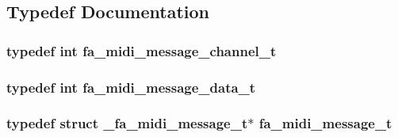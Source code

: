 \subsection{Typedef Documentation}
\hypertarget{group___fa_midi_message_gae7fc48e105b9bec5500bc422231a1159}{
\subsubsection[{fa\-\_\-midi\-\_\-message\-\_\-channel\-\_\-t}]{\setlength{\rightskip}{0pt plus 5cm}typedef int {\bf fa\-\_\-midi\-\_\-message\-\_\-channel\-\_\-t}}}\label{group___fa_midi_message_gae7fc48e105b9bec5500bc422231a1159}
\hypertarget{group___fa_midi_message_gadc3c487a2892db5309395922f92e8d28}{
\subsubsection[{fa\-\_\-midi\-\_\-message\-\_\-data\-\_\-t}]{\setlength{\rightskip}{0pt plus 5cm}typedef int {\bf fa\-\_\-midi\-\_\-message\-\_\-data\-\_\-t}}}\label{group___fa_midi_message_gadc3c487a2892db5309395922f92e8d28}
\hypertarget{group___fa_midi_message_gaa73293eb40a2cffdc2294e3cb6dc2564}{
\subsubsection[{fa\-\_\-midi\-\_\-message\-\_\-t}]{\setlength{\rightskip}{0pt plus 5cm}typedef struct \-\_\-fa\-\_\-midi\-\_\-message\-\_\-t$\ast$ {\bf fa\-\_\-midi\-\_\-message\-\_\-t}}}\label{group___fa_midi_message_gaa73293eb40a2cffdc2294e3cb6dc2564}



